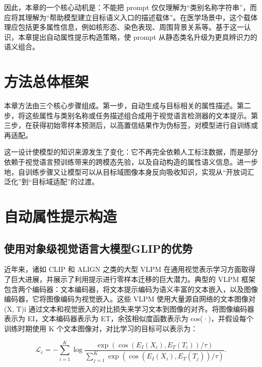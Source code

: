 因此，本章的一个核心动机是：不能把 prompt 仅仅理解为“类别名称字符串”，而应将其理解为“帮助模型建立目标语义入口的描述载体”。在医学场景中，这个载体理应包括更多属性信息，例如核形态、染色表现、周围背景关系等。基于这一认识，本章提出自动属性提示构造策略，使 prompt 从静态类名升级为更具辨识力的语义组合。

\section{方法总体框架}
本章方法由三个核心步骤组成。第一步，自动生成与目标相关的属性描述。第二步，将这些属性与类别名称或任务描述组合成用于视觉语言检测器的文本提示。第三步，在获得初始零样本预测后，以高置信结果作为伪标签，对模型进行自训练或再适配。

这一设计使模型的知识来源发生了变化：它不再完全依赖人工标注数据，而是部分依赖于视觉语言预训练带来的跨模态先验，以及自动构造的属性语义信息。进一步地，自训练步骤又让模型可以从目标域图像本身反向吸收知识，实现从“开放词汇泛化”到“目标域适配”的过渡。

\section{自动属性提示构造}

\subsection{使用对象级视觉语言大模型GLIP的优势}
近年来，诸如 CLIP \cite{radford2021learning} 和 ALIGN \cite{jia2021scaling} 之类的大型 VLPM 在通用视觉表示学习方面取得了巨大进展，并展示了利用提示进行零样本迁移的巨大潜力。典型的 VLPM 框架包含两个编码器：文本编码器，将文本提示编码为语义丰富的文本嵌入，以及图像编码器，它将图像编码为视觉嵌入。这些 VLPM 使用大量源自网络的文本图像对 {(X, T)}i 通过文本和视觉嵌入的对比损失来学习文本到图像的对齐。将图像编码器表示为 EI，文本编码器表示为 ET，余弦相似度函数表示为 cos(·)，并假设每个训练时期使用 K 个文本图像对，对比学习的目标可以表示为：

\begin{equation}
\label{eq:contrastive}
\mathcal{L}_c=-\sum_{i=1}^K \log \frac{\exp \left(\cos \left(E_I\left(X_i\right), E_T\left(T_i\right)\right) / \tau\right)}{\sum_{j=1}^K \exp \left(\cos \left(E_I\left(X_i\right), E_T\left(T_j\right)\right) / \tau\right)}.
\end{equation}


